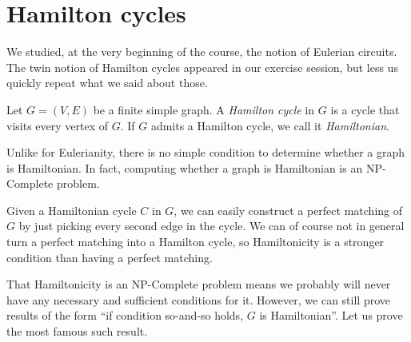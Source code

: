 \documentclass[nobib]{tufte-handout}
\begin{document}
\section{Hamilton cycles}

We studied, at the very beginning of the course, the notion of Eulerian circuits. The twin notion of Hamilton cycles appeared in our exercise session, but less us quickly repeat what we said about those.

\begin{definition}
    Let $G = (V,E)$ be a finite simple graph. A \emph{Hamilton cycle} in $G$ is a cycle that visits every vertex of $G$. If $G$ admits a Hamilton cycle, we call it \emph{Hamiltonian}.
\end{definition}

Unlike for Eulerianity, there is no simple condition to determine whether a graph is Hamiltonian. In fact, computing whether a graph is Hamiltonian is an NP-Complete problem.

\begin{remark}
    Given a Hamiltonian cycle $C$ in $G$, we can easily construct a perfect matching of $G$ by just picking every second edge in the cycle. We can of course not in general turn a perfect matching into a Hamilton cycle, so Hamiltonicity is a stronger condition than having a perfect matching.
\end{remark}

That Hamiltonicity is an NP-Complete problem means we probably will never have any necessary and sufficient conditions for it. However, we can still prove results of the form ``if condition so-and-so holds, $G$ is Hamiltonian''. Let us prove the most famous such result.
\end{document}
